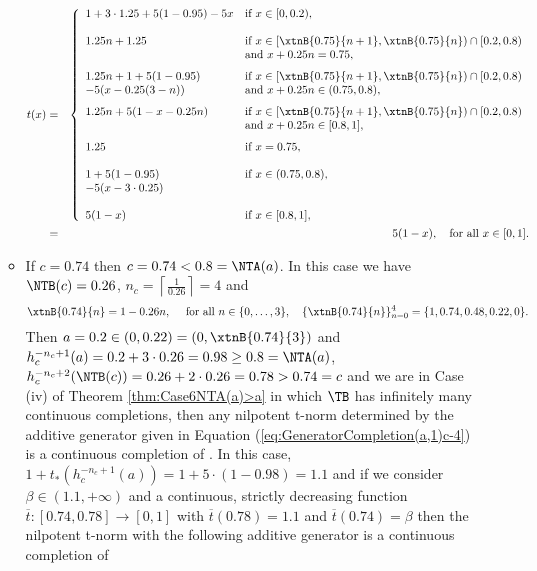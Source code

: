 \begin{example}
\begin{itemize}
\begin{itemize}
			\begin{eqnarray*}\label{eq:ExapleGenGen(iv)}
				t(x)
				&=&
				\left\{ \begin{array}{ll}
					1+3 \cdot 1.25 + 5(1-0.95) - 5x & \text{if } x \in [0,0.2), \\
					& \\
					1.25n + 1.25  & \text{if } x \in [\xtnB{0.75}{n+1},\xtnB{0.75}{n}) \cap [0.2,0.8) \\
					& \text{and } x+0.25n =0.75, \\[7pt]
					1.25n + 1 + 5(1-0.95)  & \text{if } x \in [\xtnB{0.75}{n+1},\xtnB{0.75}{n}) \cap [0.2,0.8)\\
					 - 5(x-0.25(3-n)) & \text{and } x+0.25n \in (0.75,0.8), \\[7pt]
					1.25n+ 5(1-x-0.25n)  & \text{if } x \in [\xtnB{0.75}{n+1},\xtnB{0.75}{n}) \cap [0.2,0.8)\\
					& \text{and } x+0.25n \in [0.8,1], \\[7pt]
					1.25 & \text{if } x = 0.75, \\
					& \\
					1+5(1-0.95) & \text{if } x \in (0.75,0.8),\\
					-5(x-3\cdot 0.25) & \\
					& \\
					5(1-x) & \text{if } x \in [0.8,1],
				\end{array} \right. \\ \nonumber
				&=& 5(1-x), \quad \text{for all } x \in [0,1].
			\end{eqnarray*}
			\item If $c=0.74$ then $c=0.74 < 0.8 = \NTA(a)$.  In this case we have $\NTB(c)=0.26$, $n_c = \left \lceil{\frac{1}{0.26}}\right \rceil = 4$ and
			$$\xtnB{0.74}{n}=1-0.26n, \quad \text{ for all } n \in \{0,\dots,3\}, \quad
			\{\xtnB{0.74}{n}\}_{n=0}^4 = \{1,0.74,0.48,0.22,0\}.$$
			Then  $a=0.2 \in (0,0.22) = (0,\xtnB{0.74}{3})$
			and $h_c^{-n_c+1}(a)=0.2+3\cdot 0.26 =0.98 \geq 0.8 = \NTA(a)$, $h_c^{-n_c+2}(\NTB(c))=0.26+2\cdot 0.26 =0.78>0.74=c$ and we are in Case (iv) of Theorem \ref{thm:Case6NTA(a)>a} in which $\TB$ has infinitely many continuous completions, then any nilpotent t-norm determined by the additive generator given in Equation (\ref{eq:GeneratorCompletion(a,1)c-4}) is a continuous completion of \TB. In this case, $1+t_*(h_c^{-n_c+1}(a))=1+5\cdot(1-0.98)=1.1$ and if we consider $\beta \in (1.1,+\infty)$ and  a continuous, strictly decreasing function $\overline{t}:[0.74,0.78] \to [0,1]$ with $\overline{t}(0.78) = 1.1$ and $\overline{t}(0.74)=\beta$ then the nilpotent t-norm with the following additive generator is a continuous completion of \TB

\end{itemize}
\end{itemize}
\end{example}
